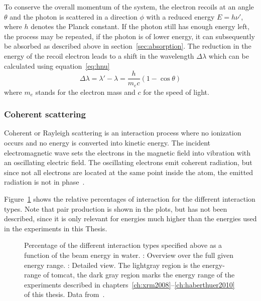 To conserve the overall momentum of the system, the electron recoils at an angle $\theta$ and the photon is scattered in a direction $\phi$ with a reduced energy $E=h\nu'$, where $h$ denotes the Planck constant. If the photon still has enough energy left, the process may be repeated, if the photon is of lower energy, it can subsequently be absorbed as described above in section~\ref{sec:absorption}. The reduction in the energy of the recoil electron leads to a shift in the wavelength $\Delta\lambda$ which can be calculated using equation~\ref{eq:hnu}
\begin{equation}
	\Delta\lambda = \lambda' - \lambda = \frac{h}{m_e c}(1-\cos{\theta})
	\label{eq:hnu}
\end{equation}
where $m_e$ stands for the electron mass and $c$ for the speed of light.

\subsubsection{Coherent scattering}
Coherent or Rayleigh scattering is an interaction process where no ionization occurs and no energy is converted into kinetic energy. The incident electromagnetic wave sets the electrons in the magnetic field into vibration with an oscillating electric field. The oscillating electrons emit coherent radiation, but since not all electrons are located at the same point inside the atom, the emitted radiation is not in phase~\cite{Hsieh2003,Stampanoni2002}.

Figure~\ref{fig:InteractionPercentage} shows the relative percentages of interaction for the different interaction types. Note that pair production is shown in the plots, but has not been described, since it is only relevant for energies much higher than the energies used in the experiments in this Thesis.

\def\width{0.5\linewidth}%
\def\height{0.309\linewidth}%
\begin{figure}
	\noindent{}%
	\caption[Interaction types]{Percentage of the different interaction types specified above as a function of the beam energy in water. : Overview over the full given energy range. : Detailed view. The lightgray region is the energy-range of \ac{tomcat}, the dark gray region marks the energy range of the experiments described in chapters~\ref{ch:xrm2008}--\ref{ch:haberthuer2010} of this thesis. Data from~\cite[Table 5-5]{Johns1983}.}%
	\label{fig:InteractionPercentage}%
\end{figure}

